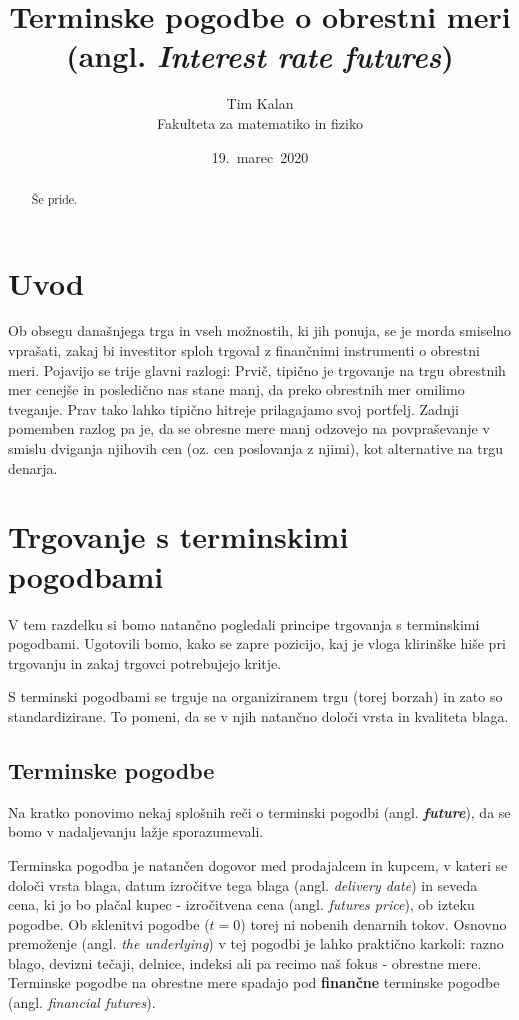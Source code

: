 \documentclass[a4paper, 12pt]{article}
\author{Tim Kalan \\ Fakulteta za matematiko in fiziko}
\title{
    Terminske pogodbe o obrestni meri \\ 
    \large (angl. \textit{Interest rate futures})}
\date{19.\ marec\ 2020} %
\begin{document}
\maketitle

\pagebreak

\begin{abstract}
    Še pride.
\end{abstract}

\pagebreak

\tableofcontents

\pagebreak

\section{Uvod}
Ob obsegu današnjega trga in vseh možnostih, ki jih ponuja, se je morda smiselno vprašati,
zakaj bi investitor sploh trgoval z finančnimi instrumenti o obrestni meri. Pojavijo se trije
glavni razlogi: Prvič, tipično je trgovanje na trgu obrestnih mer cenejše in posledično nas 
stane manj, da preko obrestnih mer omilimo tveganje. Prav tako lahko tipično hitreje prilagajamo svoj 
portfelj. Zadnji pomemben razlog pa je, da se obresne mere manj odzovejo na povpraševanje v 
smislu dviganja njihovih cen (oz. cen poslovanja z njimi), kot alternative na trgu denarja.

\section{Trgovanje s terminskimi pogodbami}
V tem razdelku si bomo natančno pogledali principe trgovanja s terminskimi pogodbami. Ugotovili
bomo, kako se zapre pozicijo, kaj je vloga klirinške hiše pri trgovanju in zakaj trgovci potrebujejo
kritje.

S terminski pogodbami se trguje na organiziranem trgu (torej borzah) in zato so standardizirane. 
To pomeni, da se v njih natančno določi vrsta in kvaliteta blaga.

\subsection{Terminske pogodbe}
Na kratko ponovimo nekaj splošnih reči o terminski pogodbi (angl. \textit{\textbf{future}}), da se 
bomo v nadaljevanju lažje sporazumevali.

Terminska pogodba je natančen dogovor med prodajalcem in kupcem, v kateri se določi vrsta
blaga, datum izročitve tega blaga (angl. \textit{delivery date}) in seveda cena, 
ki jo bo plačal kupec - izročitvena cena (angl. \textit{futures price}), ob izteku pogodbe. 
Ob sklenitvi pogodbe ($t = 0$) torej ni nobenih denarnih tokov.
Osnovno premoženje (angl. \textit{the underlying}) v tej pogodbi je lahko praktično karkoli: 
razno blago, devizni tečaji, delnice, indeksi ali pa recimo naš fokus - obrestne mere. 
Terminske pogodbe na obrestne mere spadajo pod \textbf{finančne} terminske pogodbe 
(angl. \textit{financial futures}).
\end{document}
